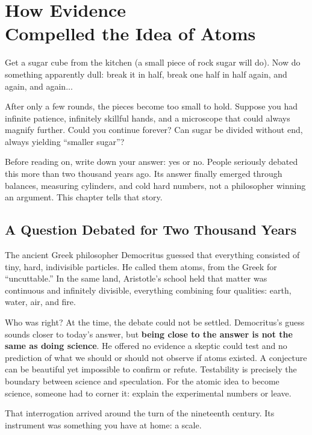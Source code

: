\chapter[How Evidence Compelled the Idea of Atoms]{How Evidence\protect\\ Compelled the Idea of Atoms}

\begin{kaichang}
Get a sugar cube from the kitchen (a small piece of rock sugar will do). Now do something apparently dull: break it in half, break one half in half again, and again, and again...

After only a few rounds, the pieces become too small to hold. Suppose you had infinite patience, infinitely skillful hands, and a microscope that could always magnify further. Could you continue forever? Can sugar be divided without end, always yielding ``smaller sugar''?

Before reading on, write down your answer: yes or no. People seriously debated this more than two thousand years ago. Its answer finally emerged through balances, measuring cylinders, and cold hard numbers, not a philosopher winning an argument. This chapter tells that story.
\end{kaichang}

\section{A Question Debated for Two Thousand Years}

The ancient Greek philosopher Democritus guessed that everything consisted of tiny, hard, indivisible particles. He called them atoms, from the Greek for ``uncuttable.'' In the same land, Aristotle's school held that matter was continuous and infinitely divisible, everything combining four qualities: earth, water, air, and fire.

Who was right? At the time, the debate could not be settled. Democritus's guess sounds closer to today's answer, but \textbf{being close to the answer is not the same as doing science}. He offered no evidence a skeptic could test and no prediction of what we should or should not observe if atoms existed. A conjecture can be beautiful yet impossible to confirm or refute. Testability is precisely the boundary between science and speculation. For the atomic idea to become science, someone had to corner it: explain the experimental numbers or leave.

That interrogation arrived around the turn of the nineteenth century. Its instrument was something you have at home: a scale.

